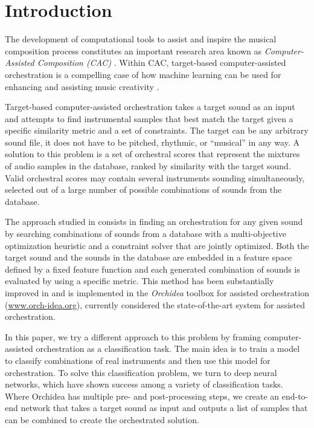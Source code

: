 \documentclass[runningheads,a4paper]{llncs}
\begin{document}
%
\section{Introduction}\label{sec:introduction}

The development of computational tools to assist and inspire the musical composition process constitutes an important research area known as \emph{Computer-Assisted Composition (CAC)} \cite{FerVic2013, Ari2005}. Within CAC, target-based computer-assisted orchestration is a compelling case of how machine learning can be used for {enhancing} and {assisting} music creativity \cite{Maresz2003}. 

Target-based computer-assisted orchestration takes a target sound as an input and attempts to find instrumental samples that best match the target given a specific similarity metric and a set of constraints. The target can be any arbitrary sound file, it does not have to be pitched, rhythmic, or ``musical'' in any way. A solution to this problem is a set of orchestral scores that represent the mixtures of audio samples in the database, ranked by similarity with the target sound. Valid orchestral scores may contain several instruments sounding simultaneously, selected out of a large number of possible combinations of sounds from the database.

The approach studied in \cite{Carpentier2010} consists in finding an orchestration for any given sound by searching combinations of sounds from a database with a multi-objective optimization heuristic and a constraint solver that are jointly optimized. Both the target sound and the sounds in the database are embedded in a feature space defined by a fixed feature function and each generated combination of sounds is evaluated by using a specific metric. This method has been substantially improved in \cite{Cella18, Cella2020} and is implemented in the \emph{Orchidea} toolbox for assisted orchestration (\url{www.orch-idea.org}), currently considered the state-of-the-art system for assisted orchestration.

In this paper, we try a different approach to this problem by framing computer-assisted orchestration as a classification task. The main idea is to train a model to classify combinations of real instruments and then use this model for orchestration. To solve this classification problem, we turn to deep neural networks, which have shown success among a variety of classification tasks. Where Orchidea has multiple pre- and post-processing steps, we create an end-to-end network that takes a target sound as input and outputs a list of samples that can be combined to create the orchestrated solution. 
\end{document}
